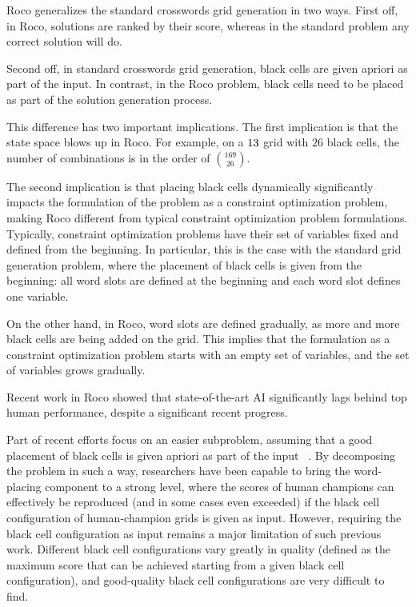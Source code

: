 {\sc Roco} generalizes the standard crosswords grid generation in two ways.
First off, in {\sc Roco}, solutions are ranked by their score,
whereas in the standard problem any correct solution will do.

Second off, in 
standard crosswords grid generation, black cells are given apriori as part of the input.
In contrast, in the {\sc Roco} problem,
black cells need to be placed as part of the solution generation process.

This difference has two important implications.
The first implication is that the state space blows up in {\sc Roco}. 
For example, on a $13 \time 13$ grid with $26$ black cells,
the number of combinations is in the order of $169 \choose 26$.

The second implication is that placing black cells dynamically significantly impacts 
the formulation of the problem as a constraint optimization problem, making 
{\sc Roco} different from typical constraint optimization problem formulations.
Typically, constraint optimization problems have their set of variables fixed
and defined from the beginning.
In particular, this is the case with the standard grid generation problem,
where the placement of black cells is given from the beginning:
all word slots are defined at the beginning and each word slot defines one variable.

On the other hand, in {\sc Roco}, word slots are defined gradually, 
as more and more black cells are being added on the grid.
This implies that the formulation as a constraint optimization problem
starts with an empty set of variables, and the set of variables grows gradually.


Recent work in {\sc Roco} showed that state-of-the-art AI significantly lags behind
top human performance, despite a significant recent progress.

Part of recent efforts focus on an easier subproblem, assuming that
a good placement of black cells is given apriori as part of the input
~\cite{DBLP:conf/socs/BoteaB21}.
By decomposing the problem in such a way, researchers have been capable
to bring the word-placing component to a strong level,
where the scores of human champions can effectively be reproduced (and in some
cases even exceeded) if the black cell configuration of human-champion grids
is given as input.
However, requiring the black cell configuration as input remains a major limitation
of such previous work. Different black cell configurations vary greatly in quality
(defined as the maximum score that can be achieved
starting from a given black cell configuration),
and good-quality black cell configurations are very difficult to find.


